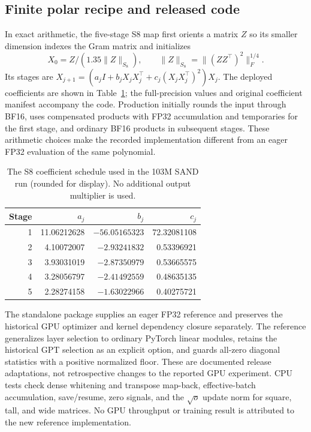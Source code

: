 \documentclass[10pt]{article}
\begin{document}
\subsection{Finite polar recipe and released code}
In exact arithmetic, the five-stage S8 map first orients a matrix $Z$ so its smaller dimension indexes the Gram matrix and initializes
\begin{equation}
 X_0=Z/(1.35\|Z\|_{S_8}),\qquad
 \|Z\|_{S_8}=\|(ZZ^\top)^2\|_F^{1/4}.
\end{equation}
Its stages are $X_{j+1}=(a_j I+b_jX_jX_j^\top+c_j(X_jX_j^\top)^2)X_j$. The deployed coefficients are shown in Table~\ref{tab:coefficients}; the full-precision values and original coefficient manifest accompany the code. Production initially rounds the input through BF16, uses compensated products with FP32 accumulation and temporaries for the first stage, and ordinary BF16 products in subsequent stages. These arithmetic choices make the recorded implementation different from an eager FP32 evaluation of the same polynomial.
\begin{table}[ht]\centering
\caption{The S8 coefficient schedule used in the 103M SAND run (rounded for display). No additional output multiplier is used.}
\label{tab:coefficients}
\begin{tabular}{rrrr}\toprule
Stage & $a_j$ & $b_j$ & $c_j$\\\midrule
1 & 11.06212628 & $-56.05165323$ & 72.32081108\\
2 & 4.10072007 & $-2.93241832$ & 0.53396921\\
3 & 3.93031019 & $-2.87350979$ & 0.53665575\\
4 & 3.28056797 & $-2.41492559$ & 0.48635135\\
5 & 2.28274158 & $-1.63022966$ & 0.40275721\\\bottomrule
\end{tabular}\end{table}

The standalone package supplies an eager FP32 reference and preserves the historical GPU optimizer and kernel dependency closure separately. The reference generalizes layer selection to ordinary PyTorch linear modules, retains the historical GPT selection as an explicit option, and guards all-zero diagonal statistics with a positive normalized floor. These are documented release adaptations, not retrospective changes to the reported GPU experiment. CPU tests check dense whitening and transpose map-back, effective-batch accumulation, save/resume, zero signals, and the $\sqrt{o}$ update norm for square, tall, and wide matrices. No GPU throughput or training result is attributed to the new reference implementation.
\end{document}

